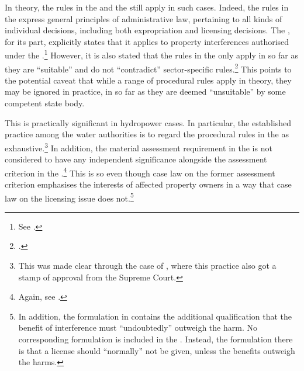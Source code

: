 In theory, the rules in the \cite{ea59} and the \cite{paa67} still apply in such cases. Indeed, the rules in the \cite{paa67} express general principles of administrative law, pertaining to all kinds of individual decisions, including both expropriation and  licensing decisions. The \cite{ea59}, for its part, explicitly states that it applies to property interferences authorised under the \cite{wra17}.\footnote{See \cite[30]{ea59}.} However, it is also stated that the rules in the \cite{ea59} only apply in so far as they are ``suitable'' and do not ``contradict'' sector-specific rules.\footcite[30]{ea59} This points to the potential caveat that while a range of procedural rules apply in theory, they may be ignored in practice, in so far as they are deemed ``unsuitable'' by some competent state body.

This is practically significant in hydropower cases. In particular, the established practice among the water authorities is to regard the procedural rules in the \cite{wra17} as exhaustive.\footnote{This was made clear through the case of \cite{jorpeland11}, where this practice also got a stamp of approval from the Supreme Court.} In addition, the material assessment requirement in the \cite{ea59} is not considered to have any independent significance alongside the assessment criterion in the \cite{wra17}.\footnote{Again, see \cite{jorpeland11}.} This is so even though case law on the former assessment criterion emphasises the interests of affected property owners in a way that case law on the licensing issue does not.\footnote{In addition, the formulation in \cite[2]{ea59} contains the additional qualification that the benefit of interference must ``undoubtedly'' outweigh the harm. No corresponding formulation is included in the \cite[8]{wra17}. Instead, the formulation there is that a license should ``normally'' not be given, unless the benefits outweigh the harms.}


